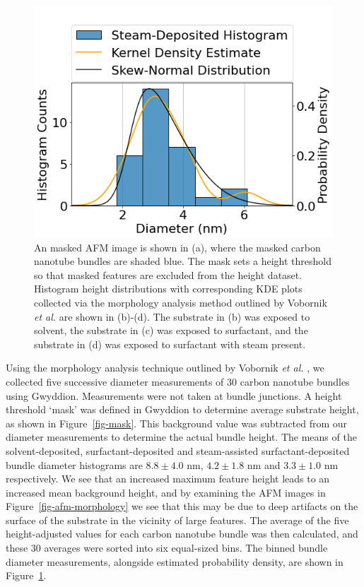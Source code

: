 \documentclass[
  a4paper,
]{scrbook}
\begin{document}
\begin{figure}
\begin{minipage}[t]{0.47\linewidth}
{{\includegraphics{figures/ch5/NT14D2_W4_pristine_cnt_histogram.png}

}

}

\subcaption{\label{fig-steamed-surfactant-cnt-histogram}}
\end{minipage}%

\caption{\label{fig-cnt-histogram}An masked AFM image is shown in (a),
where the masked carbon nanotube bundles are shaded blue. The mask sets
a height threshold so that masked features are excluded from the height
dataset. Histogram height distributions with corresponding KDE plots
collected via the morphology analysis method outlined by Vobornik
\emph{et al.} \autocite{Vobornik2023} are shown in (b)-(d). The
substrate in (b) was exposed to solvent, the substrate in (c) was
exposed to surfactant, and the substrate in (d) was exposed to
surfactant with steam present.}

\end{figure}

Using the morphology analysis technique outlined by Vobornik \emph{et
al.} \autocite{Vobornik2023}, we collected five successive diameter
measurements of 30 carbon nanotube bundles using Gwyddion. Measurements
were not taken at bundle junctions. A height threshold `mask' was
defined in Gwyddion to determine average substrate height, as shown in
Figure~\ref{fig-mask}. This background value was subtracted from our
diameter measurements to determine the actual bundle height. The means
of the solvent-deposited, surfactant-deposited and steam-assisted
surfactant-deposited bundle diameter histograms are \(8.8 \pm 4.0\) nm,
\(4.2 \pm 1.8\) nm and \(3.3 \pm 1.0\) nm respectively. We see that an
increased maximum feature height leads to an increased mean background
height, and by examining the AFM images in
Figure~\ref{fig-afm-morphology} we see that this may be due to deep
artifacts on the surface of the substrate in the vicinity of large
features. The average of the five height-adjusted values for each carbon
nanotube bundle was then calculated, and these 30 averages were sorted
into six equal-sized bins. The binned bundle diameter measurements,
alongside estimated probability density, are shown in
Figure~\ref{fig-cnt-histogram}.
\end{document}
